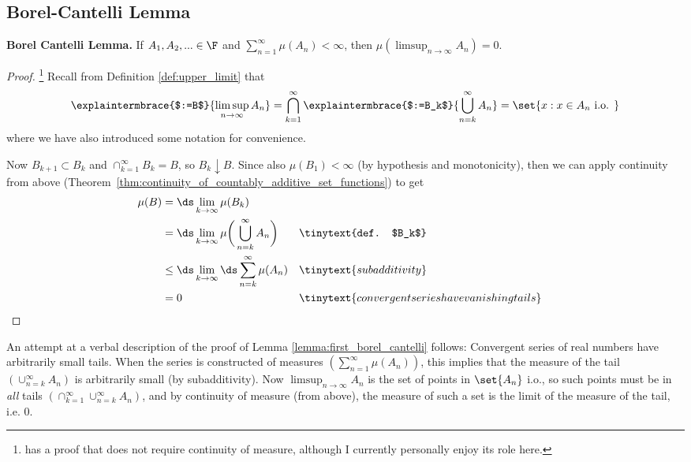 \documentclass{article} %
\begin{document}
\subsection{Borel-Cantelli Lemma}

\begin{lemma}{\textbf{Borel Cantelli Lemma.}}
If $A_1, A_2, ... \in \F$ and $\sum_{n=1}^\infty \mu(A_n) < \infty$, then $\mu(\limsup_{n \to \infty} A_n) = 0$.
\label{lemma:first_borel_cantelli}
\end{lemma}

\begin{proof}\footnote{\cite{ash2000probability} has a proof that does not require continuity of measure, although I currently personally enjoy its role here.}
Recall from Definition \ref{def:upper_limit} that
\[ \explaintermbrace{$:=B$}{\limsup_{n \to \infty} A_n} = \bigcap_{k=1}^\infty \explaintermbrace{$:=B_k$}{\bigcup_{n=k}^\infty A_n} = \set{x : x \in A_n \text{ i.o. }}  \]	
where we have also introduced some notation for convenience.

Now $B_{k+1} \subset B_k$ and $\cap_{k=1}^\infty B_k =B$, so $B_k \downarrow B$.  Since also $\mu(B_1) < \infty$ (by hypothesis and monotonicity), then we can apply continuity from above (Theorem~\ref{thm:continuity_of_countably_additive_set_functions}) to get
\begin{align*}
\mu(B) &= \ds\lim_{k \to \infty} \mu(B_k) \\
&= 	\ds\lim_{k \to \infty} \mu \bigg( \bigcup_{n=k}^\infty A_n \bigg) && \tinytext{def. $B_k$} \\
&\leq \ds\lim_{k \to \infty} \ds\sum_{n=k}^\infty \mu (A_n) && \tinytext{subadditivity} \\
&=0 && \tinytext{convergent series have vanishing tails}
\end{align*}
  
\end{proof}

\begin{remark}{}
An attempt at a verbal description of the proof of Lemma \ref{lemma:first_borel_cantelli} follows:  Convergent series of real numbers have arbitrarily small tails. When the series is constructed of measures $(\sum_{n=1}^\infty \mu(A_n))$, this implies that the measure of the tail $(\cup_{n=k}^\infty A_n)$ is arbitrarily small (by subadditivity).  Now $\limsup_{n \to \infty} A_n$ is the set of points in $\set{A_n}$ i.o., so such points must be in \textit{all} tails $(\cap_{k=1}^\infty \cup_{n=k}^\infty A_n)$, and by continuity of measure (from above), the measure of such a set is the limit of the measure of the tail, i.e. 0.
\end{remark}
\end{document}
